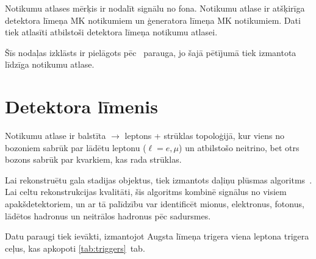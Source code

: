 Notikumu atlases mērķis ir nodalīt signālu no fona. Notikumu atlase ir atšķirīga detektora līmeņa MK notikumiem un ģeneratora līmeņa MK notikumiem. Dati tiek atlasīti atbilstoši detektora līmeņa notikumu atlasei.

Šīs nodaļas izklāsts ir pielāgots pēc~\cite{CMS-AN-2017-159} parauga, jo šajā pētījumā tiek izmantota līdzīga notikumu atlase.

\section{Detektora līmenis}
\label{sec:detector_level}

Notikumu atlase ir balstīta \ttbar$\to$ leptons + strūklas topoloģijā, kur viens no \PW bozoniem sabrūk par lādētu leptonu ($\ell=e, \mu$) un atbilstošo neitrino, bet otrs \PW bozons sabrūk par kvarkiem, kas rada strūklas.

Lai rekonstruētu gala stadijas objektus, tiek izmantots daļiņu plūsmas algoritms~\cite{Sirunyan:2017ulk}. Lai celtu rekonstrukcijas kvalitāti, šis algoritms kombinē signālus no visiem apakšdetektoriem, un ar tā palīdzību var identificēt mionus, elektronus, fotonus, lādētos hadronus un neitrālos hadronus pēc \Pp\Pp sadursmes.

Datu paraugi tiek ievākti, izmantojot \gls{Augsta līmeņa trigera} viena leptona trigera ceļus, kas apkopoti \ref{tab:triggers}~tab.

